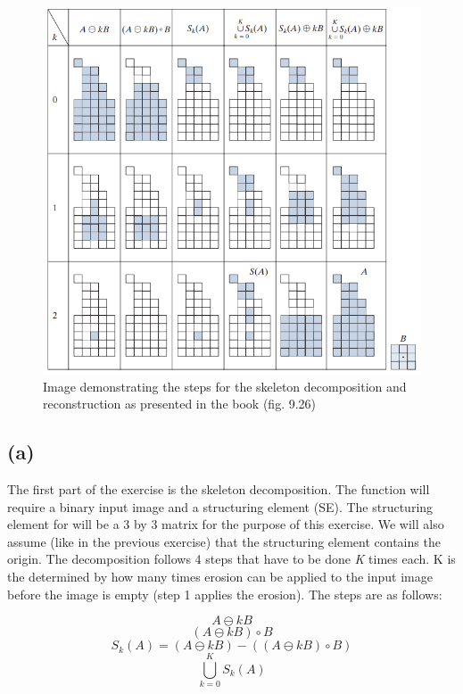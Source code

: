 \documentclass{article}
\begin{document}
\begin{figure}[H]
    \centering
    \includegraphics[width=\textwidth]{Assignment_4/output_plots/Skeleton_image_book.png}
    \caption{Image demonstrating the steps for the skeleton decomposition and reconstruction as presented in the book (fig. 9.26) \cite{gonzalez2008digital}}
    \label{fig:skeleton_book}
\end{figure}

\subsection*{(a)}
The first part of the exercise is the skeleton decomposition. The function will require a binary input image and a structuring element (SE). The structuring element for will be a 3 by 3 matrix for the purpose of this exercise. We will also assume (like in the previous exercise) that the structuring element contains the origin. The decomposition follows 4 steps that have to be done \textit{K} times each. K is the determined by how many times erosion can be applied to the input image before the image is empty (step 1 applies the erosion). The steps are as follows:

\begin{equation}\label{eq:skeleton_step1}
    A \ominus k B
\end{equation}
\begin{equation}\label{eq:skeleton_step2}
    (A \ominus k B) \circ B
\end{equation}
\begin{equation}\label{eq:skeleton_step3}
    S_k(A) = (A \ominus k B) - ((A \ominus k B) \circ B)
\end{equation}
\begin{equation}\label{eq:skeleton_step4}
    \bigcup_{k=0}^{K}S_k(A)
\end{equation}
\end{document}
